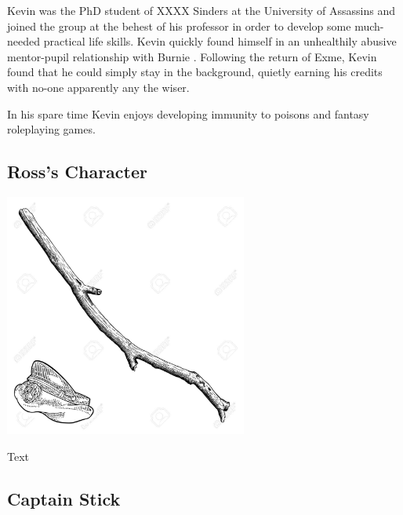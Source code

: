 \noindent 

Kevin was the PhD student of XXXX Sinders at the University of Assassins and joined the group at the behest of his professor in order to develop some much-needed practical life skills.  Kevin quickly found himself in an unhealthily abusive mentor-pupil relationship with Burnie   .  Following the return of Exme, Kevin found that he could simply stay in the background, quietly earning his credits with no-one apparently any the wiser.  

In his spare time Kevin enjoys developing immunity to poisons and fantasy roleplaying games. 

\smallskip

\subsection*{Ross's Character} 

\begin{center}
\includegraphics[width=80mm]{./content/img/xxx.png}
\begin{figure}[h]
\end{figure}
\end{center}

\noindent 

Text

\smallskip

\subsection*{Captain Stick} 

